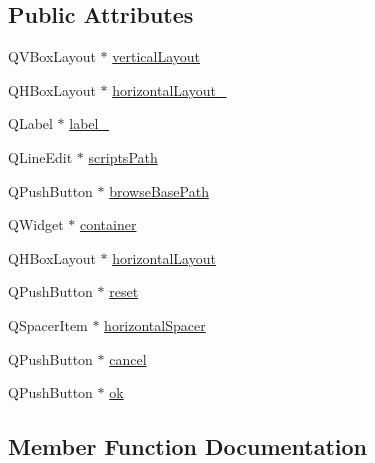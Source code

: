 \subsection*{Public Attributes}
\begin{DoxyCompactItemize}
\item 
Q\+V\+Box\+Layout $\ast$ \mbox{\hyperlink{class_ui___script_selection_form_a853841b74f7457a21ed7d36c20fc4641}{vertical\+Layout}}
\item 
Q\+H\+Box\+Layout $\ast$ \mbox{\hyperlink{class_ui___script_selection_form_a55e32277e838cf06d46d92f9f85c632f}{horizontal\+Layout\+\_}}
\item 
Q\+Label $\ast$ \mbox{\hyperlink{class_ui___script_selection_form_ab373bd40c6a6146ed4263833b790c7a8}{label\+\_}}
\item 
Q\+Line\+Edit $\ast$ \mbox{\hyperlink{class_ui___script_selection_form_a3776ec4d8aaae90051bddf5a83b40f38}{scripts\+Path}}
\item 
Q\+Push\+Button $\ast$ \mbox{\hyperlink{class_ui___script_selection_form_ac075609d8704eb47298d5204f5764b66}{browse\+Base\+Path}}
\item 
Q\+Widget $\ast$ \mbox{\hyperlink{class_ui___script_selection_form_a45f5d54554f44540d79c86785558d781}{container}}
\item 
Q\+H\+Box\+Layout $\ast$ \mbox{\hyperlink{class_ui___script_selection_form_ad0f3f1cc5a4091c8af4c1cb01ce2c3f2}{horizontal\+Layout}}
\item 
Q\+Push\+Button $\ast$ \mbox{\hyperlink{class_ui___script_selection_form_ac572893b732a449306a59b6e1532c1ab}{reset}}
\item 
Q\+Spacer\+Item $\ast$ \mbox{\hyperlink{class_ui___script_selection_form_ae816ba1b4348c88b085eade45092ad4a}{horizontal\+Spacer}}
\item 
Q\+Push\+Button $\ast$ \mbox{\hyperlink{class_ui___script_selection_form_aac50e5b075d47b8a52a6c0b9c88cbfe3}{cancel}}
\item 
Q\+Push\+Button $\ast$ \mbox{\hyperlink{class_ui___script_selection_form_ad900cc1d911032ade910d7a6777c9d8a}{ok}}
\end{DoxyCompactItemize}


\subsection{Member Function Documentation}
\mbox{\label{class_ui___script_selection_form_a8d0f33910be1ec066470f5f17b384cc8}} 
